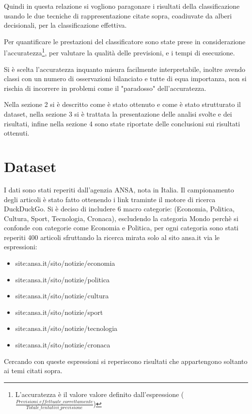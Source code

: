 \documentclass[runningheads]{llncs}
\begin{document}
Quindi in questa relazione si vogliono paragonare i risultati della classificazione usando le due tecniche di rappresentazione citate sopra, coadiuvate da alberi decisionali\cite{tree}, per la classificazione effettiva.

Per quantificare le prestazioni del classificatore sono state prese in considerazione l'accuratezza\footnote{L'accuratezza \`e il valore valore definito dall'espressione ($\frac{ Previsioni\_effettuate\_correttamente}{Totale\_tentativi\_previsione}$)}, per valutare la qualit\`a delle previsioni, e i tempi di esecuzione.

Si \`e scelta l'accuratezza inquanto misura facilmente interpretabile, inoltre avendo classi con un numero di osservazioni bilanciato e tutte di equa importanza, non si rischia di incorrere in problemi come il "paradosso" dell'accuratezza.

Nella sezione 2 si \`e descritto come \`e stato ottenuto e come \`e stato strutturato il dataset, nella sezione 3 si \`e trattata la presentazione delle analisi svolte e dei risultati, infine nella sezione 4 sono state riportate delle conclusioni sui risultati ottenuti.

\section{Dataset}
\label{sec:dataset}

I dati sono stati reperiti dall'agenzia ANSA, nota in Italia. Il campionamento degli articoli \`e stato fatto ottenendo i link traminte il motore di
ricerca DuckDuckGo. Si \`e deciso di includere 6 macro categorie: (Economia, Politica, Cultura, Sport, Tecnologia, Cronaca), escludendo la categoria Mondo perch\`e si confonde con categorie come Economia e Politica, per
ogni categoria sono stati reperiti 400 articoli sfruttando la ricerca mirata solo al sito ansa.it via le espressioni:
\begin{itemize}
\item site:ansa.it/sito/notizie/economia
\item site:ansa.it/sito/notizie/politica
\item site:ansa.it/sito/notizie/cultura
\item site:ansa.it/sito/notizie/sport
\item site:ansa.it/sito/notizie/tecnologia
\item site:ansa.it/sito/notizie/cronaca
\end{itemize}

Cercando con queste espressioni si reperiscono risultati che appartengono soltanto ai temi citati sopra.
\end{document}
